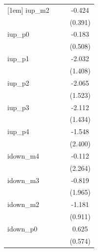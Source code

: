\begin{table}[htbp]
\begin{tabular}{l*{3}{c}}
[1em]
iup\_m2              &                     &                     &      -0.424         \\
                    &                     &                     &     (0.391)         \\
[1em]
iup\_p0              &                     &                     &      -0.183         \\
                    &                     &                     &     (0.508)         \\
[1em]
iup\_p1              &                     &                     &      -2.032         \\
                    &                     &                     &     (1.408)         \\
[1em]
iup\_p2              &                     &                     &      -2.065         \\
                    &                     &                     &     (1.523)         \\
[1em]
iup\_p3              &                     &                     &      -2.112         \\
                    &                     &                     &     (1.434)         \\
[1em]
iup\_p4              &                     &                     &      -1.548         \\
                    &                     &                     &     (2.400)         \\
[1em]
idown\_m4            &                     &                     &      -0.112         \\
                    &                     &                     &     (2.264)         \\
[1em]
idown\_m3            &                     &                     &      -0.819         \\
                    &                     &                     &     (1.965)         \\
[1em]
idown\_m2            &                     &                     &      -1.181         \\
                    &                     &                     &     (0.911)         \\
[1em]
idown\_p0            &                     &                     &       0.625         \\
                    &                     &                     &     (0.574)         \\

\end{tabular}
\end{table}
